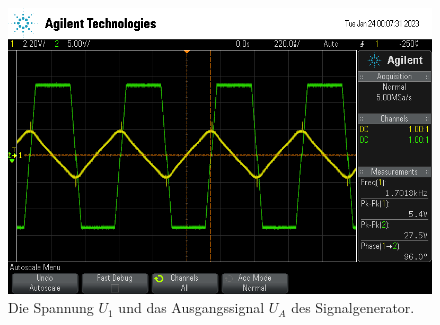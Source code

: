 \begin{figure}
    \centering
    \includegraphics[width=\textwidth]{usb/Signal.png}
    \caption{ Die Spannung $U_1$ und das Ausgangssignal $U_A$ des Signalgenerator.}
    \label{fig:sig}
\end{figure}